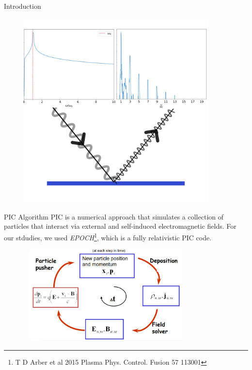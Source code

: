 \documentclass{beamer}
\begin{document}
\begin{frame}{Introduction}
\begin{minipage}[h]{0.48\linewidth}
\begin{figure}
            \includegraphics[width=0.9\textwidth, height=0.42\textheight]{images/harmonics.png}
            \label{fig:harmonics}
        \end{figure}
    \end{minipage}
\end{frame}

\begin{frame}{PIC Algorithm}
    \small
    PIC is a numerical approach that simulates a collection of particles that interact via external and self-induced electromagnetic fields. For our stdudies, we used \textit{EPOCH}\footnote{T D Arber et al 2015 Plasma Phys. Control. Fusion 57 113001}, which is a fully relativistic PIC code.
    \begin{figure}
        \includegraphics[width=9cm, height=5cm]{images/PIC.png}
        \centering
    \end{figure}

\end{frame}
\end{document}
